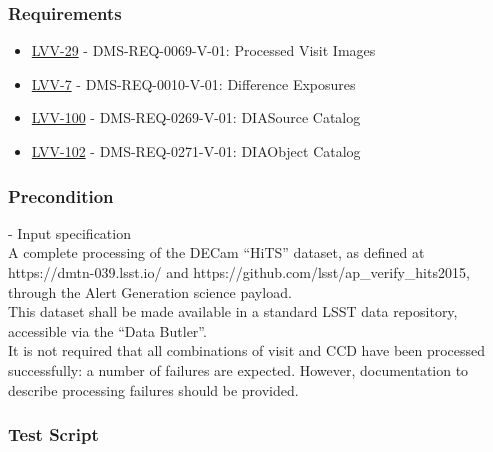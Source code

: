 \subsubsection{Requirements}\label{requirements-1}

\begin{itemize}
\tightlist
\item
  \href{https://jira.lsstcorp.org/browse/LVV-29}{LVV-29} -
  DMS-REQ-0069-V-01: Processed Visit Images
\item
  \href{https://jira.lsstcorp.org/browse/LVV-7}{LVV-7} -
  DMS-REQ-0010-V-01: Difference Exposures
\item
  \href{https://jira.lsstcorp.org/browse/LVV-100}{LVV-100} -
  DMS-REQ-0269-V-01: DIASource Catalog
\item
  \href{https://jira.lsstcorp.org/browse/LVV-102}{LVV-102} -
  DMS-REQ-0271-V-01: DIAObject Catalog
\end{itemize}

\subsubsection{Precondition}\label{precondition-1}

- Input specification\\[2\baselineskip]A complete processing of the
DECam ``HiTS'' dataset, as defined at https://dmtn-039.lsst.io/ and
https://github.com/lsst/ap\_verify\_hits2015, through the Alert
Generation science payload.\\
This dataset shall be made available in a standard LSST data repository,
accessible via the ``Data Butler''.\\
It is not required that all combinations of visit and CCD have been
processed successfully: a number of failures are expected. However,
documentation to describe processing failures should be provided.

\subsubsection{Test Script}\label{test-script-1}

